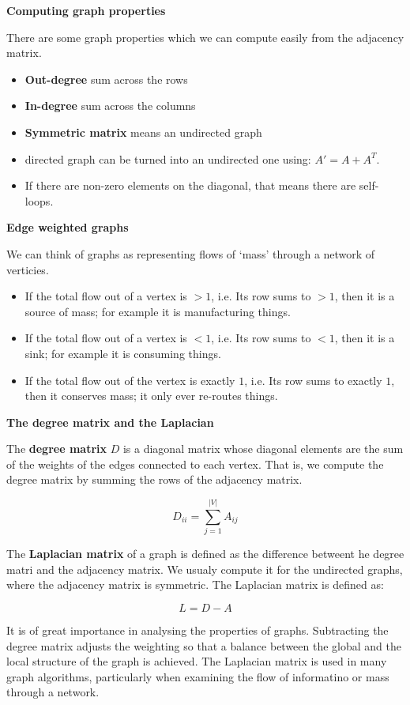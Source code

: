 \documentclass{article}
\begin{document}
\textbf{Computing graph properties}

There are some graph properties which we can compute easily from the adjacency matrix.
\begin{itemize}
    \item \textbf{Out-degree} sum across the rows
    \item \textbf{In-degree} sum across the columns
    \item \textbf{Symmetric matrix} means an undirected graph
    \item directed graph can be turned into an undirected one using: $A' = A + A^T$.
    \item If there are non-zero elements on the diagonal, that means there are self-loops.
\end{itemize}

\textbf{Edge weighted graphs}

We can think of graphs as representing flows of `mass' through a network of verticies.

\begin{itemize}
    \item If the total flow out of a vertex is $> 1$, i.e. Its row sums to $> 1$, then it is a source of mass; for example it is manufacturing things.
    \item If the total flow out of a vertex is $< 1$, i.e. Its row sums to $< 1$, then it is a sink; for example it is consuming things.
    \item If the total flow out of the vertex is exactly $1$, i.e. Its row sums to exactly $1$, then it conserves mass; it only ever re-routes things.
\end{itemize}

\textbf{The degree matrix and the Laplacian}

The \textbf{degree matrix} $D$ is a diagonal matrix whose diagonal elements are the sum of the weights of the edges connected
to each vertex. That is, we compute the degree matrix by summing the rows of the adjacency matrix.

\[
D_{ii} = \sum_{j=1}^{|V|} A_{ij}
\]

The \textbf{Laplacian matrix} of a graph is defined as the difference betweent he degree matri and the adjacency matrix.
We usualy compute it for the undirected graphs, where the adjacency matrix is symmetric. The Laplacian matrix is defined as:

\[
L = D - A
\]

It is of great importance in analysing the properties of graphs.
Subtracting the degree matrix adjusts the weighting so that a balance between the global and the local structure of the graph is achieved.
The Laplacian matrix is used in many graph algorithms, particularly when examining the flow of informatino or mass through a network.
\end{document}
